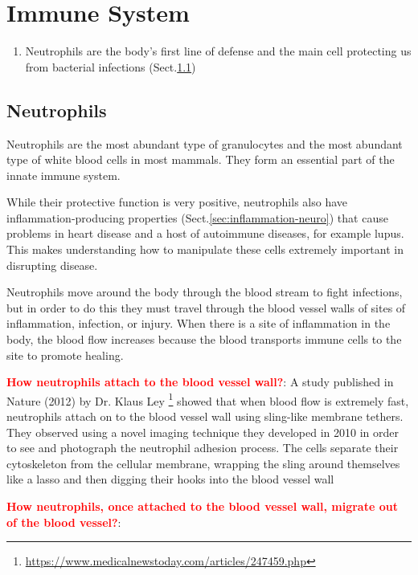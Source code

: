 \section{Immune System}
\label{sec:immune-system}

\begin{enumerate}
  \item  Neutrophils are the body's first line of defense and the main cell protecting us from bacterial infections 
  (Sect.\ref{sec:neutrophils})
\end{enumerate}

\subsection{Neutrophils}
\label{sec:neutrophils}

Neutrophils are the most abundant type of granulocytes and the most abundant
type of white blood cells in most mammals. They form an essential part of the
innate immune system.

While their protective function is very positive, neutrophils also have
inflammation-producing properties (Sect.\ref{sec:inflammation-neuro}) that cause
problems in heart disease and a host of autoimmune diseases, for example lupus.
This makes understanding how to manipulate these cells extremely important in
disrupting disease.

Neutrophils move around the body through the blood stream to fight infections,
but in order to do this they must travel through the blood vessel walls of sites
of inflammation, infection, or injury.
When there is a site of inflammation in the body, the blood flow increases because the blood transports immune cells to the site to promote healing.

\textcolor{red}{\bf How neutrophils attach to the blood vessel wall?}:
A study published in Nature (2012) by Dr. Klaus Ley
\footnote{\url{https://www.medicalnewstoday.com/articles/247459.php}}
showed that when blood flow is extremely fast, neutrophils attach on to the
blood vessel wall using sling-like membrane tethers. They observed using
a novel imaging technique they developed in 2010 in order to see and photograph
the neutrophil adhesion process.
The cells separate their cytoskeleton from the cellular membrane, wrapping the sling around themselves like a lasso and then digging their hooks into the blood vessel wall



\textcolor{red}{\bf How neutrophils, once attached to the blood vessel wall, migrate out of the blood vessel?}:

